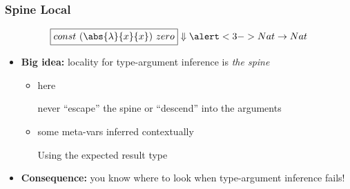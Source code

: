 \documentclass{beamer}
\begin{document}
\begin{frame}
  \frametitle{Spine Local}
  \[\fbox{$const\ (\abs{\lambda}{x}{x})\ zero$} \Downarrow \alert<3->{Nat \to Nat}\]

  \begin{itemize}
  \item \textbf{Big idea:} locality for type-argument inference is \textit{the
      spine}
    \begin{itemize}
    \item<2->  here

      never ``escape'' the spine or ``descend'' into the arguments

    \item<3-> some meta-vars inferred \alert{contextually}

      Using the expected result type
    \end{itemize}
  \item<4-> \textbf{Consequence:} you know where to look when type-argument
    inference fails!
  \end{itemize}

  \centering
  \ \\ \ \\
\end{frame}
\end{document}
